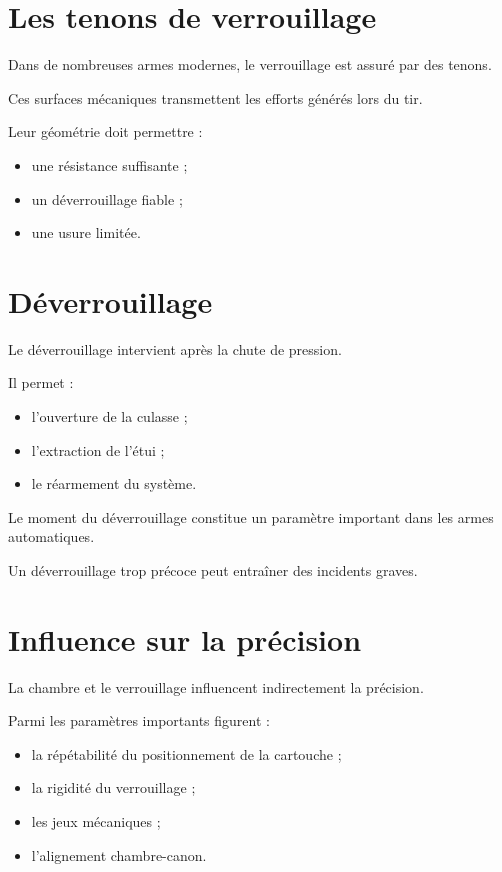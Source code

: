 \section{Les tenons de verrouillage}

Dans de nombreuses armes modernes, le verrouillage est assuré par des
tenons.

Ces surfaces mécaniques transmettent les efforts générés lors du tir.

Leur géométrie doit permettre :

\begin{itemize}
    \item une résistance suffisante ;
    \item un déverrouillage fiable ;
    \item une usure limitée.
\end{itemize}

\section{Déverrouillage}

Le déverrouillage intervient après la chute de pression.

Il permet :

\begin{itemize}
    \item l'ouverture de la culasse ;
    \item l'extraction de l'étui ;
    \item le réarmement du système.
\end{itemize}

Le moment du déverrouillage constitue un paramètre important dans les armes
automatiques.

Un déverrouillage trop précoce peut entraîner des incidents graves.

\section{Influence sur la précision}

La chambre et le verrouillage influencent indirectement la précision.

Parmi les paramètres importants figurent :

\begin{itemize}
    \item la répétabilité du positionnement de la cartouche ;
    \item la rigidité du verrouillage ;
    \item les jeux mécaniques ;
    \item l'alignement chambre-canon.
\end{itemize}

